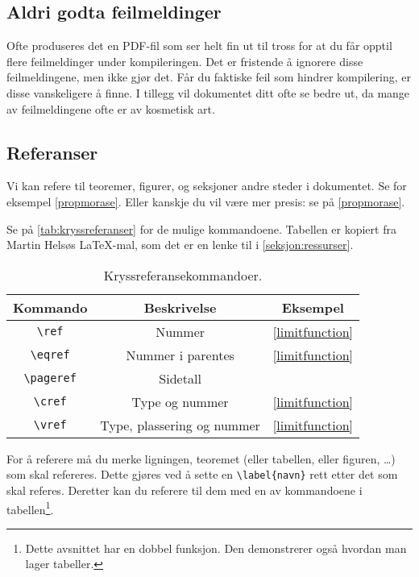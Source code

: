 \documentclass[a4paper, norsk]{article}  %
\begin{document}
\subsection{Aldri godta feilmeldinger}

Ofte produseres det en PDF-fil som ser helt fin ut til tross for at du får opptil flere feilmeldinger under kompileringen. Det er fristende å ignorere disse feilmeldingene, men ikke gjør det. Får du faktiske feil som hindrer kompilering, er disse vanskeligere å finne. I tillegg vil dokumentet ditt ofte se bedre ut, da mange av feilmeldingene ofte er av kosmetisk art.

\subsection{Referanser}

Vi kan refere til teoremer, figurer, og seksjoner andre steder i dokumentet. Se for eksempel \cref{propmorase}. Eller kanskje du vil være mer presis: se på \vref{propmorase}.

Se på \vref{tab:kryssreferanser} for de mulige kommandoene. Tabellen er kopiert fra Martin Helsøs \LaTeX-mal, som det er en lenke til i \vref{seksjon:ressurser}.

\begin{table}
\centering
\begin{tabular}{ccc}
\hline
    Kommando & Beskrivelse & Eksempel \\
\hline
    \texttt{\textbackslash ref}     & Nummer            & \ref{limitfunction}        \\
    \texttt{\textbackslash eqref}   & Nummer i parentes & \eqref{limitfunction}      \\
    \texttt{\textbackslash pageref} & Sidetall          & \pageref{limitfunction}    \\
    \texttt{\textbackslash cref}    & Type og nummer    & \cref{limitfunction}       \\
    \texttt{\textbackslash vref} & Type, plassering og nummer & \vref{limitfunction} \\
\end{tabular}
\caption{Kryssreferansekommandoer.}
\label{tab:kryssreferanser}
\end{table}

For å referere må du merke ligningen, teoremet (eller tabellen, eller figuren, \dots) som skal refereres. Dette gjøres ved å sette en \verb|\label{navn}| rett etter det som skal referes. Deretter kan du referere til dem med en av kommandoene i tabellen\footnote{Dette avsnittet har en dobbel funksjon. Den demonstrerer også hvordan man lager tabeller.}.
\end{document}
